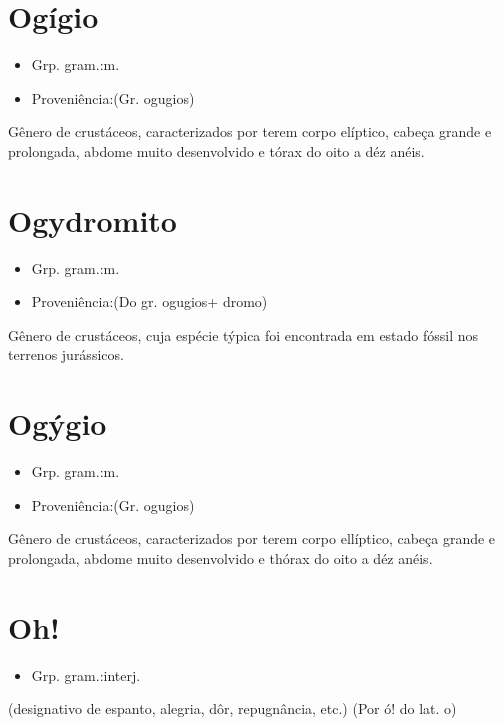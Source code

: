 \section{Ogígio}
\begin{itemize}
\item {Grp. gram.:m.}
\end{itemize}
\begin{itemize}
\item {Proveniência:(Gr. \textunderscore ogugios\textunderscore )}
\end{itemize}
Gênero de crustáceos, caracterizados por terem corpo elíptico, cabeça grande e prolongada, abdome muito desenvolvido e tórax do oito a déz anéis.
\section{Ogydromito}
\begin{itemize}
\item {Grp. gram.:m.}
\end{itemize}
\begin{itemize}
\item {Proveniência:(Do gr. \textunderscore ogugios\textunderscore  + \textunderscore dromo\textunderscore )}
\end{itemize}
Gênero de crustáceos, cuja espécie týpica foi encontrada em estado fóssil nos terrenos jurássicos.
\section{Ogýgio}
\begin{itemize}
\item {Grp. gram.:m.}
\end{itemize}
\begin{itemize}
\item {Proveniência:(Gr. \textunderscore ogugios\textunderscore )}
\end{itemize}
Gênero de crustáceos, caracterizados por terem corpo ellíptico, cabeça grande e prolongada, abdome muito desenvolvido e thórax do oito a déz anéis.
\section{Oh!}
\begin{itemize}
\item {Grp. gram.:interj.}
\end{itemize}
(designativo de \textunderscore espanto\textunderscore , \textunderscore alegria\textunderscore , \textunderscore dôr\textunderscore , \textunderscore repugnância\textunderscore , etc.)
(Por \textunderscore ó\textunderscore ! do lat. \textunderscore o\textunderscore )
